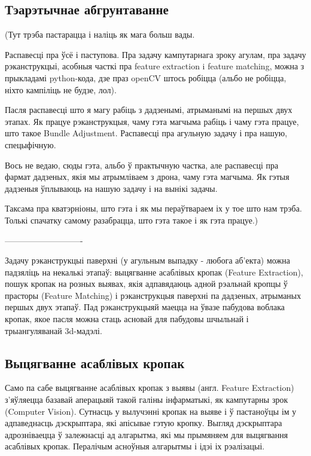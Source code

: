 \begin{center}
    \section*{Тэарэтычнае абгрунтаванне}    
\end{center}


(Тут трэба пастарацца і наліць як мага больш вады.

Распавесці пра ўсё і паступова. Пра задачу кампутарнага зроку агулам, пра задачу рэканструкцыі, асобныя часткі пра feature extraction i feature matching, можна з прыкладамі python-кода, дзе праз openCV штось робіцца (альбо не робіцца, ніхто кампіліць не будзе, лол). 

Пасля распавесці што я магу рабіць з дадзенымі, атрыманымі на першых двух этапах. Як працуе рэканструкцыя, чаму гэта магчыма рабіць і чаму гэта працуе, што такое Bundle Adjustment. Распавесці пра агульную задачу і пра нашую, спецыфічную.

Вось не ведаю, сюды гэта, альбо ў практычную частка, але распавесці пра фармат дадзеных, якія мы атрымліваем з дрона, чаму гэта магчыма. Як гэтыя дадзеныя ўплываюць на нашую задачу і на вынікі задачы.

Таксама пра кватэрніоны, што гэта і як мы пераўтвараем іх у тое што нам трэба. Толькі спачатку самому разабрацца, што гэта такое і як гэта працуе.)

----------------------------

Задачу рэканструкцыі паверхні (у агульным выпадку - любога аб'екта) можна падзяліць на некалькі этапаў: выцягванне асаблівых кропак (Feature Extraction), пошук кропак на розных выявах, якія адпавядаюць адной рэальнай кропцы ў прасторы (Feature Matching) і рэканструкцыя паверхні па дадзеных, атрыманых  першых двух этапаў. Пад рэканструкцыяй маецца на ўвазе пабудова воблака кропак, якое пасля можна стаць асновай для пабудовы шчыльнай і трыангуляванай 3d-мадэлі.\\

\subsection*{Выцягванне асаблівых кропак}
Само па сабе выцягванне асаблівых кропак з выявы (англ. Feature Extraction) з'яўляецца базавай аперацыяй такой галіны інфарматыкі, як кампутарны зрок (Computer Vision). Сутнасць у вылучэнні кропак на выяве і ў пастаноўцы ім у адпаведнасць дэскрыптара, які апісывае гэтую кропку. Выгляд дэскрыптара адрозніваецца ў залежнасці ад алгарытма, які мы прымяняем для выцягвання асаблівых кропак. Пералічым асноўныя алгарытмы і ідэі іх рэалізацыі. 

